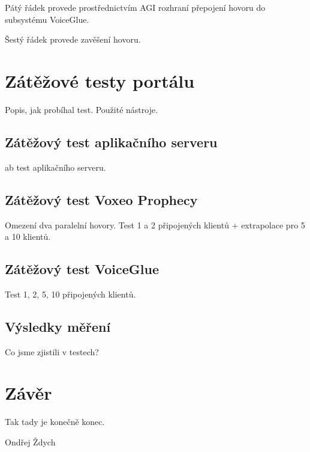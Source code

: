 \documentclass[ing,male,java,dept460]{diploma}						%
\begin{document}
Pátý řádek provede prostřednictvím AGI rozhraní přepojení hovoru do subsystému VoiceGlue.

Šestý řádek provede zavěšení hovoru.

\section{Zátěžové testy portálu}
\label{sec:Benchmark}
Popis, jak probíhal test. Použité nástroje.

\subsection{Zátěžový test aplikačního serveru}
ab test aplikačního serveru.

\subsection{Zátěžový test Voxeo Prophecy}
Omezení dva paralelní hovory. Test 1 a 2 připojených klientů + extrapolace pro 5 a 10 klientů.

\subsection{Zátěžový test VoiceGlue}
Test 1, 2, 5, 10 připojených klientů.

\subsection{Výsledky měření}
Co jsme zjistili v testech?

\section{Závěr}
\label{sec:Conclusion}
Tak tady je konečně konec.

\bigskip
\begin{flushright}
Ondřej Ždych
\end{flushright}
\end{document}
